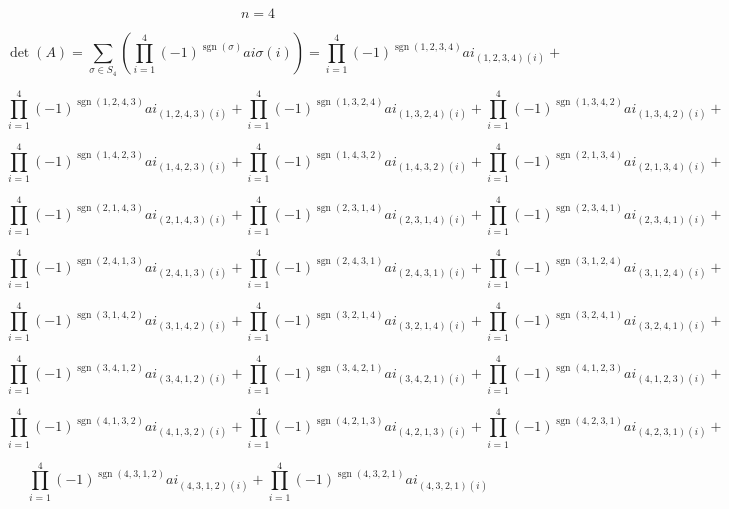 \documentclass[12pt]{article}
\begin{document}
$$n = 4$$

$$\operatorname{det}(A)=\sum_{\sigma \in S_{4}}  \left(\prod_{i=1}^{4} (-1)^ {\operatorname{sgn}(\sigma)}  ai \sigma (i) \right) = 
\prod_{i=1}^{4} (-1)^ {\operatorname{sgn}(1, 2, 3, 4)}  ai_{(1, 2, 3, 4) (i)} + $$

$$\prod_{i=1}^{4} (-1)^ {\operatorname{sgn}(1, 2, 4, 3)}  ai_{(1, 2, 4, 3) (i)} + 
\prod_{i=1}^{4} (-1)^ {\operatorname{sgn}(1, 3, 2, 4)}  ai_{(1, 3, 2, 4) (i)} + 
\prod_{i=1}^{4} (-1)^ {\operatorname{sgn}(1, 3, 4, 2)}  ai_{(1, 3, 4, 2) (i)} + $$

$$\prod_{i=1}^{4} (-1)^ {\operatorname{sgn}(1, 4, 2, 3)}  ai_{(1, 4, 2, 3) (i)} + 
\prod_{i=1}^{4} (-1)^ {\operatorname{sgn}(1, 4, 3, 2)}  ai_{(1, 4, 3, 2) (i)} + 
\prod_{i=1}^{4} (-1)^ {\operatorname{sgn}(2, 1, 3, 4)}  ai_{(2, 1, 3, 4) (i)} + $$

$$\prod_{i=1}^{4} (-1)^ {\operatorname{sgn}(2, 1, 4, 3)}  ai_{(2, 1, 4, 3) (i)} + 
\prod_{i=1}^{4} (-1)^ {\operatorname{sgn}(2, 3, 1, 4)}  ai_{(2, 3, 1, 4) (i)} + 
\prod_{i=1}^{4} (-1)^ {\operatorname{sgn}(2, 3, 4, 1)}  ai_{(2, 3, 4, 1) (i)} + $$

$$\prod_{i=1}^{4} (-1)^ {\operatorname{sgn}(2, 4, 1, 3)}  ai_{(2, 4, 1, 3) (i)} + 
\prod_{i=1}^{4} (-1)^ {\operatorname{sgn}(2, 4, 3, 1)}  ai_{(2, 4, 3, 1) (i)} + 
\prod_{i=1}^{4} (-1)^ {\operatorname{sgn}(3, 1, 2, 4)}  ai_{(3, 1, 2, 4) (i)} + $$

$$\prod_{i=1}^{4} (-1)^ {\operatorname{sgn}(3, 1, 4, 2)}  ai_{(3, 1, 4, 2) (i)} + 
\prod_{i=1}^{4} (-1)^ {\operatorname{sgn}(3, 2, 1, 4)}  ai_{(3, 2, 1, 4) (i)} + 
\prod_{i=1}^{4} (-1)^ {\operatorname{sgn}(3, 2, 4, 1)}  ai_{(3, 2, 4, 1) (i)} + $$

$$\prod_{i=1}^{4} (-1)^ {\operatorname{sgn}(3, 4, 1, 2)}  ai_{(3, 4, 1, 2) (i)} + 
\prod_{i=1}^{4} (-1)^ {\operatorname{sgn}(3, 4, 2, 1)}  ai_{(3, 4, 2, 1) (i)} + 
\prod_{i=1}^{4} (-1)^ {\operatorname{sgn}(4, 1, 2, 3)}  ai_{(4, 1, 2, 3) (i)} + $$

$$\prod_{i=1}^{4} (-1)^ {\operatorname{sgn}(4, 1, 3, 2)}  ai_{(4, 1, 3, 2) (i)} + 
\prod_{i=1}^{4} (-1)^ {\operatorname{sgn}(4, 2, 1, 3)}  ai_{(4, 2, 1, 3) (i)} + 
\prod_{i=1}^{4} (-1)^ {\operatorname{sgn}(4, 2, 3, 1)}  ai_{(4, 2, 3, 1) (i)} + $$

$$\prod_{i=1}^{4} (-1)^ {\operatorname{sgn}(4, 3, 1, 2)}  ai_{(4, 3, 1, 2) (i)} + 
\prod_{i=1}^{4} (-1)^ {\operatorname{sgn}(4, 3, 2, 1)}  ai_{(4, 3, 2, 1) (i)} $$
\newpage
\end{document}
